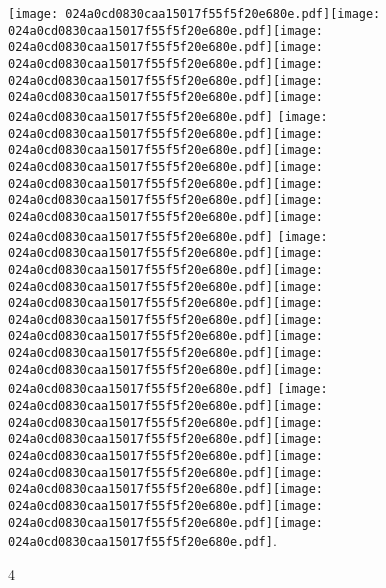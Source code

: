 \documentclass{article}
\newcommand{\origpg}[2]{\texttt{[image: 024a0cd0830caa15017f55f5f20e680e.pdf]}}
\begin{document}
{\vspace{0.656pt}\origpg4{85.303pt 110.11pt 92.469pt 126.25pt}\origpg4{92.517pt 110.11pt 100.57pt 126.25pt}\origpg4{100.47pt 110.11pt 108.54pt 126.25pt}\hspace{-0.597pt}\origpg4{107.95pt 110.11pt 119.1pt 126.25pt}\origpg4{119.04pt 110.11pt 127.67pt 126.25pt}\origpg4{127.67pt 110.11pt 138.52pt 126.25pt}\origpg4{138.52pt 110.11pt 146.59pt 126.25pt} \origpg4{150.57pt 110.11pt 157.19pt 126.25pt}\hspace{-0.113pt}\origpg4{157.08pt 110.11pt 164.24pt 126.25pt}\origpg4{164.29pt 110.11pt 170.67pt 126.25pt}\hspace{-0.113pt}\origpg4{170.56pt 110.11pt 178.63pt 126.25pt}\hspace{-0.113pt}\origpg4{178.51pt 110.11pt 186.13pt 126.25pt}\origpg4{186.21pt 110.11pt 197.06pt 126.25pt}\origpg4{197.06pt 110.11pt 205.13pt 126.25pt} \origpg4{209.08pt 110.11pt 216.93pt 126.25pt}\origpg4{217.02pt 110.11pt 225.08pt 126.25pt}\origpg4{224.98pt 110.11pt 232.15pt 126.25pt}\hspace{-0.178pt}\origpg4{231.97pt 110.11pt 239.02pt 126.25pt}\hspace{-0.307pt}\origpg4{238.72pt 110.11pt 246.79pt 126.25pt}\hspace{-0.597pt}\origpg4{246.19pt 110.11pt 254.31pt 126.25pt}\origpg4{254.36pt 110.11pt 262.99pt 126.25pt}\origpg4{262.99pt 110.11pt 273.84pt 126.25pt}\origpg4{273.84pt 110.11pt 281.91pt 126.25pt} \origpg4{285.89pt 110.11pt 293.06pt 126.25pt}\origpg4{293.11pt 110.11pt 300.73pt 126.25pt}\hspace{-0.387pt}\origpg4{300.34pt 110.11pt 307.39pt 126.25pt}\hspace{-0.307pt}\origpg4{307.09pt 110.11pt 315.16pt 126.25pt}\hspace{-0.355pt}\origpg4{314.8pt 110.11pt 325.02pt 126.25pt}\origpg4{324.92pt 110.11pt 332.09pt 126.25pt}\hspace{-0.662pt}\origpg4{331.43pt 110.11pt 338.48pt 126.25pt}\hspace{-0.307pt}\origpg4{338.17pt 110.11pt 346.24pt 126.25pt}\hspace{-0.113pt}\origpg4{346.13pt 110.11pt 353.75pt 126.25pt}. 

\vspace{27.94pt} 

\vspace{32.449pt}\hspace{230.88pt}4 

\vspace{18.308pt} }%
\end{document}
